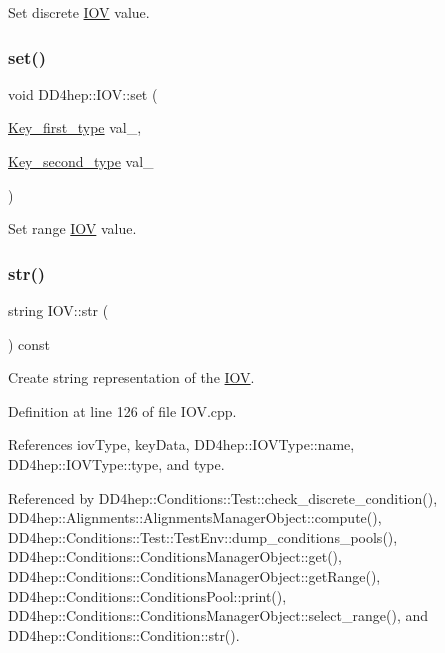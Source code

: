 Set discrete \hyperlink{class_d_d4hep_1_1_i_o_v}{I\+OV} value. 

\hypertarget{class_d_d4hep_1_1_i_o_v_ab1157ed01d8a99029c6d2cfc9379ac9b}{}\label{class_d_d4hep_1_1_i_o_v_ab1157ed01d8a99029c6d2cfc9379ac9b} 
\subsubsection{\texorpdfstring{set()}{set()}\hspace{0.1cm}{\footnotesize\ttfamily [3/3]}}
{\footnotesize\ttfamily void D\+D4hep\+::\+I\+O\+V\+::set (\begin{DoxyParamCaption}\item[{\hyperlink{class_d_d4hep_1_1_i_o_v_a3f518f6b507c82c4ee614e52b3519325}{Key\+\_\+first\+\_\+type}}]{val\+\_,  }\item[{\hyperlink{class_d_d4hep_1_1_i_o_v_ae1e4d1584dcc17a416008a93d94376b5}{Key\+\_\+second\+\_\+type}}]{val\+\_ }\end{DoxyParamCaption})}



Set range \hyperlink{class_d_d4hep_1_1_i_o_v}{I\+OV} value. 

\hypertarget{class_d_d4hep_1_1_i_o_v_a07992c19b3f256286999cf9b3edade48}{}\label{class_d_d4hep_1_1_i_o_v_a07992c19b3f256286999cf9b3edade48} 
\subsubsection{\texorpdfstring{str()}{str()}}
{\footnotesize\ttfamily string I\+O\+V\+::str (\begin{DoxyParamCaption}{ }\end{DoxyParamCaption}) const}



Create string representation of the \hyperlink{class_d_d4hep_1_1_i_o_v}{I\+OV}. 



Definition at line 126 of file I\+O\+V.\+cpp.



References iov\+Type, key\+Data, D\+D4hep\+::\+I\+O\+V\+Type\+::name, D\+D4hep\+::\+I\+O\+V\+Type\+::type, and type.



Referenced by D\+D4hep\+::\+Conditions\+::\+Test\+::check\+\_\+discrete\+\_\+condition(), D\+D4hep\+::\+Alignments\+::\+Alignments\+Manager\+Object\+::compute(), D\+D4hep\+::\+Conditions\+::\+Test\+::\+Test\+Env\+::dump\+\_\+conditions\+\_\+pools(), D\+D4hep\+::\+Conditions\+::\+Conditions\+Manager\+Object\+::get(), D\+D4hep\+::\+Conditions\+::\+Conditions\+Manager\+Object\+::get\+Range(), D\+D4hep\+::\+Conditions\+::\+Conditions\+Pool\+::print(), D\+D4hep\+::\+Conditions\+::\+Conditions\+Manager\+Object\+::select\+\_\+range(), and D\+D4hep\+::\+Conditions\+::\+Condition\+::str().




